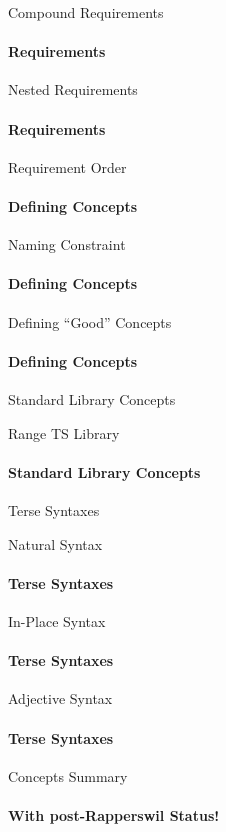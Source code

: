 \documentclass{beamer}
\begin{document}
    \begin{frame}[fragile]{Compound Requirements}
        \framesubtitle{Requirements}
    \end{frame}

    \begin{frame}[fragile]{Nested Requirements}
        \framesubtitle{Requirements}
    \end{frame}

    \begin{frame}[fragile]{Requirement Order}
        \framesubtitle{Defining Concepts}
    \end{frame}

    \begin{frame}[fragile]{Naming Constraint}
        \framesubtitle{Defining Concepts}
    \end{frame}

    \begin{frame}[fragile]{Defining ``Good'' Concepts}
        \framesubtitle{Defining Concepts}
    \end{frame}

    \begin{frame}[fragile]{Standard Library Concepts}
    \end{frame}

    \begin{frame}[fragile]{Range TS Library}
        \framesubtitle{Standard Library Concepts}
    \end{frame}

    \begin{frame}[fragile]{Terse Syntaxes}
    \end{frame}

    \begin{frame}[fragile]{Natural Syntax}
        \framesubtitle{Terse Syntaxes}
    \end{frame}

    \begin{frame}[fragile]{In-Place Syntax}
        \framesubtitle{Terse Syntaxes}
    \end{frame}

    \begin{frame}[fragile]{Adjective Syntax}
        \framesubtitle{Terse Syntaxes}
    \end{frame}

    \begin{frame}[fragile]{Concepts Summary}
        \framesubtitle{With post-Rapperswil Status!}
    \end{frame}
\end{document}
